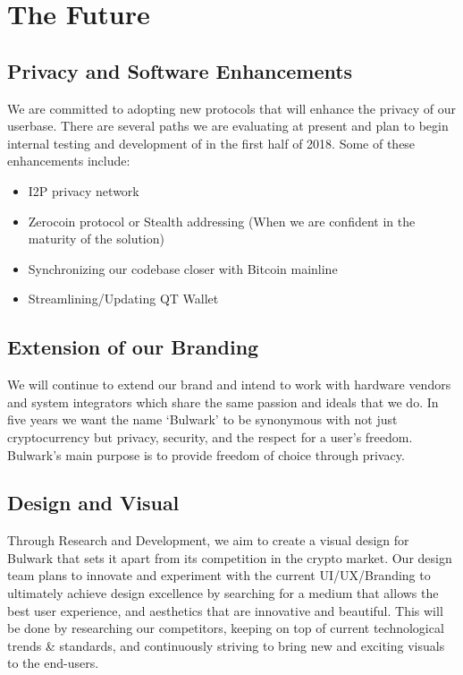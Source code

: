 \documentclass[11pt,a4paperpaper,]{report}
\providecommand{\tightlist}{%
  \setlength{\itemsep}{0pt}\setlength{\parskip}{0pt}}
\begin{document}
\chapter{The Future}\label{the-future}

\section{Privacy and Software
Enhancements}\label{privacy-and-software-enhancements}

We are committed to adopting new protocols that will enhance the privacy
of our userbase. There are several paths we are evaluating at present
and plan to begin internal testing and development of in the first half
of 2018. Some of these enhancements include:

\begin{itemize}
\tightlist
\item
  I2P privacy network
\item
  Zerocoin protocol or Stealth addressing (When we are confident in the
  maturity of the solution)
\item
  Synchronizing our codebase closer with Bitcoin mainline
\item
  Streamlining/Updating QT Wallet
\end{itemize}

\section{Extension of our Branding}\label{extension-of-our-branding}

We will continue to extend our brand and intend to work with hardware
vendors and system integrators which share the same passion and ideals
that we do. In five years we want the name `Bulwark' to be synonymous
with not just cryptocurrency but privacy, security, and the respect for
a user's freedom. Bulwark's main purpose is to provide freedom of choice
through privacy.

\section{Design and Visual}\label{design-and-visual}

Through Research and Development, we aim to create a visual design for
Bulwark that sets it apart from its competition in the crypto market.
Our design team plans to innovate and experiment with the current
UI/UX/Branding to ultimately achieve design excellence by searching for
a medium that allows the best user experience, and aesthetics that are
innovative and beautiful. This will be done by researching our
competitors, keeping on top of current technological trends \&
standards, and continuously striving to bring new and exciting visuals
to the end-users.
\end{document}
